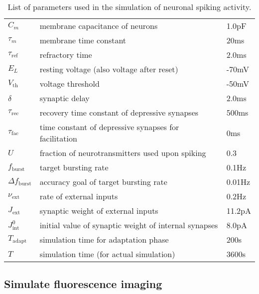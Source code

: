 \documentclass[a4paper,11pt]{article}
\begin{document}
\begin{table}[ht]
  \begin{center}
    \begin{tabular}
      {|ll|l|} %
      \hline
      $C_m$ & membrane capacitance of neurons & 1.0pF \\
      $\tau_m$ & membrane time constant & 20ms \\
      $\tau_{\text{ref}}$ & refractory time & 2.0ms \\
      $E_L$ & resting voltage (also voltage after reset) & -70mV \\
      $V_{\text{th}}$ & voltage threshold & -50mV \\
      $\delta$ & synaptic delay & 2.0ms \\
      $\tau_{\text{rec}}$ & recovery time constant of depressive synapses & 500ms \\
      $\tau_{\text{fac}}$ & time constant of depressive synapses for facilitation & 0ms \\
      $U$ & fraction of neurotransmitters used upon spiking & 0.3 \\
      $f_{\text{burst}}$ & target bursting rate & 0.1Hz \\
      $\Delta f_{\text{burst}}$ & accuracy goal of target bursting rate & 0.01Hz \\
      $\nu_{\text{ext}}$ & rate of external inputs & 0.2Hz \\
      $J_{\text{ext}}$ & synaptic weight of external inputs & 11.2pA \\
      $J_{\text{int}}^0$ & initial value of synaptic weight of internal synapses & 8.0pA \\
      $T_{\text{adapt}}$ & simulation time for adaptation phase & 200s \\
      $T$ & simulation time (for actual simulation) & 3600s \\
      \hline
    \end{tabular}
  \end{center}
  \caption{List of parameters used in the simulation of neuronal spiking activity.}
  \label{tab:parameters_spiking}
\end{table}



\subsection{Simulate fluorescence imaging}
\end{document}
